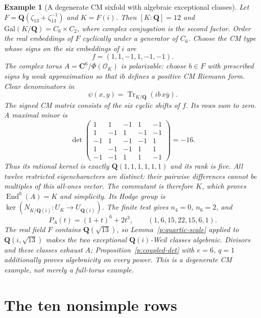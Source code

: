 \documentclass[10pt,reqno]{article}
\theoremstyle{emphasizedplain}
\theoremstyle{emphasizeddefinition}
\newtheorem{example}[theorem]{Example}
\theoremstyle{emphasizeddefinition}
\DeclareMathOperator{\End}{End}
\DeclareMathOperator{\Tr}{Tr}
\newcommand{\Q}{\mathbf Q}
\newcommand{\C}{\mathbf C}
\begin{document}
\begin{example}[A degenerate CM sixfold with algebraic exceptional classes]
Let $F=\Q(\zeta_{13}+\zeta_{13}^{-1})$ and $K=F(i)$.
Then $[K:\Q]=12$ and $\mathrm{Gal}(K/\Q)=C_6\times C_2$,
where complex conjugation is the second factor. Order the real
embeddings of $F$ cyclically under a generator of $C_6$. Choose the
CM type whose signs on the six embeddings of $i$ are
\[
 f=(1,1,-1,1,-1,-1).
\]
The complex torus $A=\C^6/\Phi(\mathcal O_K)$ is polarizable:
choose $b\in F$ with prescribed signs by weak approximation so that
$ib$ defines a positive CM Riemann form. Clear denominators in
\[\psi(x,y)=\Tr_{K/\Q}(ib\,x\overline y).\]
The signed CM matrix consists of the six cyclic shifts of $f$.
Its rows sum to zero. A maximal minor is
\[
 \det\begin{pmatrix}
 1&1&-1&1&-1\\
 1&-1&1&-1&-1\\
 -1&1&-1&-1&1\\
 1&-1&-1&1&1\\
 -1&-1&1&1&-1
 \end{pmatrix}=-16.
\]
Thus its rational kernel is exactly $\Q(1,1,1,1,1,1)$ and its rank
is five. All twelve restricted eigencharacters are distinct: their
pairwise differences cannot be multiples of this all-ones vector.
The commutant is therefore $K$, which proves $\End^0(A)=K$ and simplicity.
Its Hodge group is $\ker(N_{K/\Q(i)}:U_K\to U_{\Q(i)})$.
The finite test gives $n_4=0$, $n_6=2$, and
\[
 P_A(t)=(1+t)^6+2t^3,
 \qquad (1,6,15,22,15,6,1).
\]
The real field $F$ contains $\Q(\sqrt{13})$, so
Lemma~\ref{p:quartic-scale} applied to $\Q(i,\sqrt{13})$ makes the
two exceptional $\Q(i)$-Weil classes algebraic.
Divisors and these classes exhaust $A$; Proposition~\ref{p:coupled-det}
with $e=6$, $q=1$ additionally proves algebraicity on every power.
This is a degenerate CM example, not merely a full-torus example.
\end{example}

\part{The ten nonsimple rows}
\end{document}
